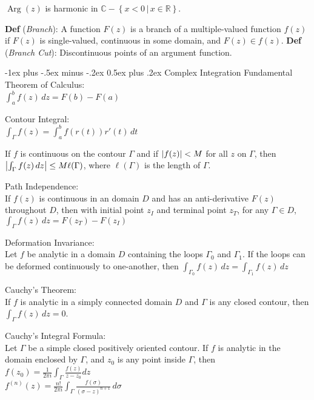 \documentclass[12pt,landscape]{article}
\makeatletter
\renewcommand{\section}{\@startsection{section}{1}{0mm}%
                                {-1ex plus -.5ex minus -.2ex}%
                                {0.5ex plus .2ex}%
                                {\normalfont\normalsize\bfseries}}
\newcommand{\tab}{\hspace{.02\textwidth}}
\newcommand{\ds}{\displaystyle}
\newcommand{\defn}[1]{\textbf{Def} (\emph{#1})}
\newcommand{\set}[1]{\left\{ #1 \right\}}
\DeclareMathOperator{\Arg}{Arg}
\theoremstyle{definition}
\makeatother
\begin{document}
\begin{multicols}{3}
\begin{theorem}
	$\Arg(z)$ is harmonic in $\mathbb{C} - \set{x < 0 \,\vert\, x\in\mathbb{R}}$.
\end{theorem}
\defn{Branch}: A function $F(z)$ is a branch of a multiple-valued function $f(z)$ if $F(z)$ is single-valued, continuous in some domain, and $F(z) \in f(z)$.
\defn{Branch Cut}: Discontinuous points of an argument function.

\section{Complex Integration}
Fundamental Theorem of Calculus:\\
\tab $\ds \int_{a}^{b} f(z)\,dz = F(b) - F(a)$

Contour Integral:\\
\tab $\ds \int_{\Gamma}f(z) = \int_{a}^{b} f(r(t))r'(t)\,dt$

\begin{theorem}
	If $f$ is continuous on the contour $\Gamma$ and if $\abs{f(z)} < M$ for all $z$ on $\Gamma$, then $\abs{\int_\Gamma f(z)\,dz} \leq M\ell(\Gamma)$, where $\ell(\Gamma)$ is the length of $\Gamma$.
\end{theorem}

Path Independence:\\
\tab If $f(z)$ is continuous in an domain $D$ and has an anti-derivative $F(z)$ throughout $D$, then with initial point $z_I$ and terminal point $z_T$, for any $\Gamma \in D$, $\int_\Gamma f(z)\,dz = F(z_T) - F(z_I)$ 

Deformation Invariance:\\
\tab Let $f$ be analytic in a domain $D$ containing the loops $\Gamma_0$ and $\Gamma_1$. If the loops can be deformed continuously to one-another, then $\int_{\Gamma_0} f(z)\,dz = \int_{\Gamma_1}f(z)\,dz$

Cauchy's Theorem:\\
\tab If $f$ is analytic in a simply connected domain $D$ and $\Gamma$ is any closed contour, then $\int_\Gamma f(z)\,dz = 0$.

Cauchy's Integral Formula:\\
\tab Let $\Gamma$ be a simple closed positively oriented contour. If $f$ is analytic in the domain enclosed by $\Gamma$, and $z_0$ is any point inside $\Gamma$, then\\
\tab $\ds f(z_0) = \frac{1}{2\pi i}\int_{\Gamma}\frac{f(z)}{z-z_0}dz$\\
\tab $\ds f^{(n)}(z) = \frac{n!}{2\pi i}\int_{\Gamma}\frac{f(\sigma)}{(\sigma-z)^{n+1}}\,d\sigma$


\end{multicols}
\end{document}
